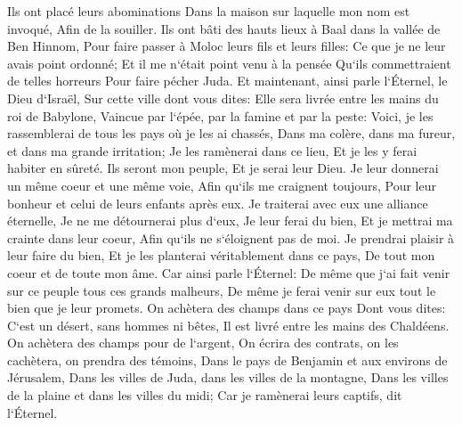 \verse Ils ont placé leurs abominations Dans la maison sur laquelle mon nom est invoqué, Afin de la souiller. 
\verse Ils ont bâti des hauts lieux à Baal dans la vallée de Ben Hinnom, Pour faire passer à Moloc leurs fils et leurs filles: Ce que je ne leur avais point ordonné; Et il me n`était point venu à la pensée Qu`ils commettraient de telles horreurs Pour faire pécher Juda. 
\verse Et maintenant, ainsi parle l`Éternel, le Dieu d`Israël, Sur cette ville dont vous dites: Elle sera livrée entre les mains du roi de Babylone, Vaincue par l`épée, par la famine et par la peste: 
\verse Voici, je les rassemblerai de tous les pays où je les ai chassés, Dans ma colère, dans ma fureur, et dans ma grande irritation; Je les ramènerai dans ce lieu, Et je les y ferai habiter en sûreté. 
\verse Ils seront mon peuple, Et je serai leur Dieu. 
\verse Je leur donnerai un même coeur et une même voie, Afin qu`ils me craignent toujours, Pour leur bonheur et celui de leurs enfants après eux. 
\verse Je traiterai avec eux une alliance éternelle, Je ne me détournerai plus d`eux, Je leur ferai du bien, Et je mettrai ma crainte dans leur coeur, Afin qu`ils ne s`éloignent pas de moi. 
\verse Je prendrai plaisir à leur faire du bien, Et je les planterai véritablement dans ce pays, De tout mon coeur et de toute mon âme. 
\verse Car ainsi parle l`Éternel: De même que j`ai fait venir sur ce peuple tous ces grands malheurs, De même je ferai venir sur eux tout le bien que je leur promets. 
\verse On achètera des champs dans ce pays Dont vous dites: C`est un désert, sans hommes ni bêtes, Il est livré entre les mains des Chaldéens. 
\verse On achètera des champs pour de l`argent, On écrira des contrats, on les cachètera, on prendra des témoins, Dans le pays de Benjamin et aux environs de Jérusalem, Dans les villes de Juda, dans les villes de la montagne, Dans les villes de la plaine et dans les villes du midi; Car je ramènerai leurs captifs, dit l`Éternel. 

